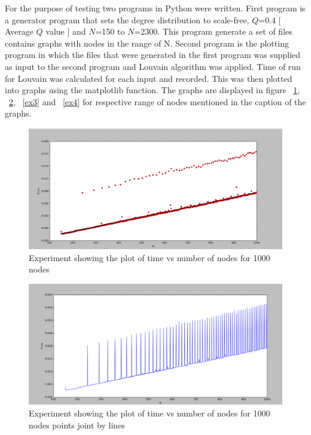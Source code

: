 \par For the purpose of testing two programs in Python were written. First program is a generator program that sets the degree distribution to scale-free, $Q$=0.4 [ Average $Q$ value ] and $N$=150 to $N$=2300. This program generate a set of files contains graphs with nodes in the range of N. Second program is the plotting program in which the files that were generated in the first program was supplied as input to the second program and Louvain algorithm was applied. Time of run for Louvain was calculated for each input and recorded. This was then plotted into graphs using the matplotlib function. The graphs are displayed in figure ~\ref{ex1}, ~\ref{ex2}, ~\ref{ex3} and ~\ref{ex4} for respective range of nodes mentioned in the caption of the graphs.

\begin{figure}[H]
\centering
\includegraphics[scale=0.3]{e1000.png}
\caption{\label{ex1}Experiment showing the plot of time vs number of nodes for 1000 nodes}
\end{figure}

\begin{figure}[H]
\centering
\includegraphics[scale=0.3]{e1000b.png}
\caption{\label{ex2}Experiment showing the plot of time vs number of nodes for 1000 nodes points joint by lines}
\end{figure}

